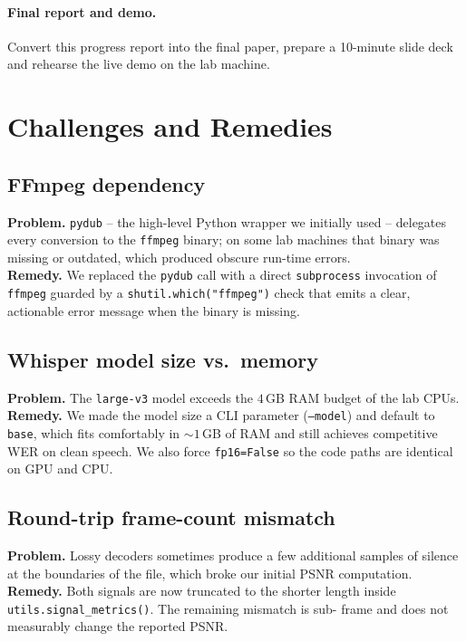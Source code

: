 \documentclass[twocolumn,10pt,a4paper]{article}
\begin{document}
\paragraph{Final report and demo.}
Convert this progress report into the final paper, prepare a 10-minute
slide deck and rehearse the live demo on the lab machine.

\section{Challenges and Remedies}\label{sec:challenges}
\subsection{FFmpeg dependency}
\textbf{Problem.}  \texttt{pydub} -- the high-level Python wrapper we
initially used -- delegates every conversion to the \texttt{ffmpeg}
binary; on some lab machines that binary was missing or outdated, which
produced obscure run-time errors.\\
\textbf{Remedy.}  We replaced the \texttt{pydub} call with a direct
\texttt{subprocess} invocation of \texttt{ffmpeg} guarded by a
\texttt{shutil.which("ffmpeg")} check that emits a clear, actionable
error message when the binary is missing.

\subsection{Whisper model size vs.\ memory}
\textbf{Problem.}  The \texttt{large-v3} model exceeds the $4$\,GB RAM
budget of the lab CPUs.\\
\textbf{Remedy.}  We made the model size a CLI parameter
(\texttt{--model}) and default to \texttt{base}, which fits comfortably
in $\sim 1$\,GB of RAM and still achieves competitive WER on clean
speech.  We also force \texttt{fp16=False} so the code paths are
identical on GPU and CPU.

\subsection{Round-trip frame-count mismatch}
\textbf{Problem.}  Lossy decoders sometimes produce a few additional
samples of silence at the boundaries of the file, which broke our
initial PSNR computation.\\
\textbf{Remedy.}  Both signals are now truncated to the shorter length
inside \texttt{utils.signal\_metrics()}.  The remaining mismatch is sub-
frame and does not measurably change the reported PSNR.
\end{document}
